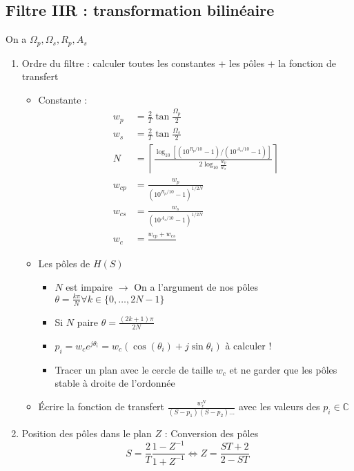 \documentclass[9pt]{article}
\begin{document}
\begin{multicols}{2}
\subsection{Filtre IIR : transformation bilinéaire}
On a $ \Omega _p, \Omega _s, R_p, A_s $ 
\begin{enumerate}
    \item Ordre du filtre : calculer toutes les constantes + les pôles + la fonction de transfert 
        \begin{itemize}
            \item Constante :
                \begin{align*}
                    w_p &= \frac{2}{T} \tan \frac{\Omega_p }{2} \\
                    w_s &= \frac{2}{T} \tan \frac{\Omega_s }{2} \\
                    N &= \left\lceil \frac{\log_{10} [(10^{R_p/10} - 1)/(10^{A_s/10} - 1)]}{2 \log_{10} \frac{w_p}{w_s}}\right\rceil \\
                    w_{cp} &= \frac{w_p}{(10^{R_p/10} - 1)^{1/2N}} \\
                    w_{cs} &= \frac{w_s}{(10^{A_s/10} - 1)^{1/2N}} \\
                    w_c &= \frac{w_{cp} + w_{cs}}{}
                \end{align*}
            \item Les pôles de $ H(S) $ 
                \begin{itemize}
                    \item $ N $ est impaire $\rightarrow$ On a l'argument de nos pôles $ \theta = \frac{k \pi }{N} \forall k \in \{0, \dots, 2N-1\} $ 
                    \item Si $ N $ paire $ \theta = \frac{(2k+1)\pi }{2N} $ 
                    \item $ p_i = w_c e^{j \theta_i } = w_c (\cos (\theta _i) + j \sin \theta _i)$ à calculer ! 
                    \item Tracer un plan avec le cercle de taille $ w_c $  et ne garder que les pôles stable à droite de l'ordonnée 
                \end{itemize}
            \item Écrire la fonction de transfert $ \frac{w_c^N}{(S-p_1)(S-p_2)\dots} $ avec les valeurs des $ p_i \in \mathbb{C}$ 
        \end{itemize}
    \item Position des pôles dans le plan $ Z $ : Conversion des pôles 
    \[
        S = \frac{2}{T} \frac{1 - Z^{-1}}{1 + Z^{-1}} \Leftrightarrow Z = \frac{ST + 2}{2 - ST}
\]
\end{enumerate}
\end{multicols}
\end{document}
